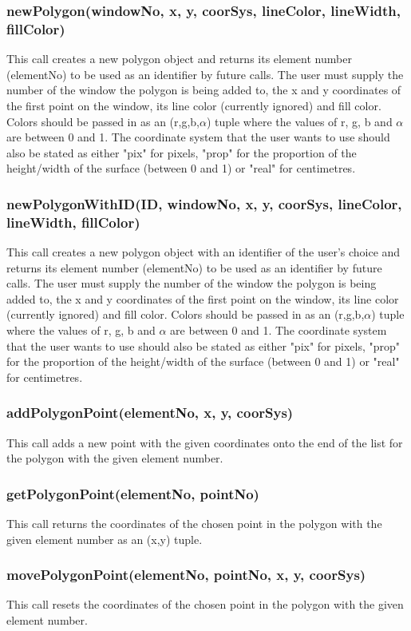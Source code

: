 \documentclass{acm_proc_article-sp}
\begin{document}
\subsubsection{newPolygon(windowNo, x, y, coorSys, lineColor, lineWidth, fillColor)}
This call creates a new polygon object and returns its element number (elementNo) to be used as an identifier by future calls. The user must supply the number of the window the polygon is being added to, the x and y coordinates of the first point on the window, its line color (currently ignored) and fill color. Colors should be passed in as an (r,g,b,$\alpha$) tuple where the values of r, g, b and $\alpha$ are between 0 and 1. The coordinate system that the user wants to use should also be stated as either "pix" for pixels, "prop" for the proportion of the height/width of the surface (between 0 and 1) or "real" for centimetres.
\subsubsection{newPolygonWithID(ID, windowNo, x, y, coorSys, lineColor, lineWidth, fillColor)}
This call creates a new polygon object with an identifier of the user's choice and returns its element number (elementNo) to be used as an identifier by future calls. The user must supply the number of the window the polygon is being added to, the x and y coordinates of the first point on the window, its line color (currently ignored) and fill color. Colors should be passed in as an (r,g,b,$\alpha$) tuple where the values of r, g, b and $\alpha$ are between 0 and 1. The coordinate system that the user wants to use should also be stated as either "pix" for pixels, "prop" for the proportion of the height/width of the surface (between 0 and 1) or "real" for centimetres.
\subsubsection{addPolygonPoint(elementNo, x, y, coorSys)}
This call adds a new point with the given coordinates onto the end of the list for the polygon with the given element number.
\subsubsection{getPolygonPoint(elementNo, pointNo)}
This call returns the coordinates of the chosen point in the polygon with the given element number as an (x,y) tuple.
\subsubsection{movePolygonPoint(elementNo, pointNo, x, y, coorSys)}
This call resets the coordinates of the chosen point in the polygon with the given element number.
\end{document}
